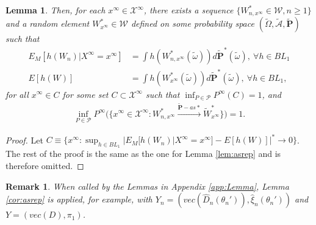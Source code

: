 \documentclass[letterpaper,11pt]{article}
\theoremstyle{myplain}
\newtheorem{lemma}{Lemma}[section]
\theoremstyle{mydefinition}
\theoremstyle{myremark}
\newtheorem{remark}{Remark}[section]
\numberwithin{equation}{section}
\numberwithin{figure}{section}
\begin{document}
\begin{appendices}
\begin{lemma}
Then, for each $x^\infty\in\mathcal X^\infty$, there exists a sequence $\{W^*_{n,x^\infty}\in \mathcal W,n\ge 1\}$ and a  random element $W^*_{x^\infty}\in\mathcal W$ defined on some probability space $(\tilde\Omega,\tilde{\mathcal A},\tilde{\mathbf P})$ such that
\begin{align}
	E_M[h(W_n)|X^\infty=x^\infty]&=\int h(W^*_{n,x^\infty}(\tilde \omega))d\tilde{\mathbf P}^*(\tilde\omega),~\forall h\in BL_1\\
	E[h(W)]&=\int h(W^*_{x^\infty}(\tilde\omega))d\tilde{\mathbf P}^*(\tilde\omega),~\forall h\in BL_1,
\end{align}
for all $x^\infty\in C$ for some set $C\subset \mathcal X^\infty$ such that $\inf_{P\in\mathcal P}P^\infty(C)=1$, and
\begin{align}
	\inf_{P\in\mathcal P}P^\infty\Big(\big\{x^\infty\in \mathcal X^\infty:W^*_{n,x^\infty}\stackrel{\tilde{\mathbf P}-as*}{\to}\tilde W^*_{x^\infty}\big\}\Big)=1.\label{eq:asconv2}
\end{align}
\end{lemma}

\begin{proof}
Let $C\equiv\{x^\infty:\sup_{h\in BL_1}|E_M[h(W_n)|X^\infty=x^\infty]-E[h(W)]|^*\stackrel{}{\to} 0\}$.
The rest of the proof is the same as the one for Lemma \ref{lem:asrep} and is therefore omitted.
\end{proof}

\begin{remark}
When called by the Lemmas in Appendix \ref{app:Lemma}, Lemma \ref{cor:asrep} is applied, for example, with $Y_n=(vec(\hat D_n(\theta_n')),\hat \xi_n(\theta_n'))$ and $Y=(vec(D), \pi_1)$.
\end{remark}
\end{appendices}
\newpage
\end{document}
